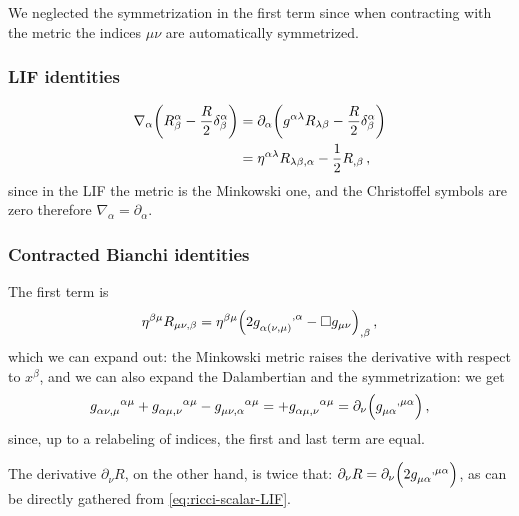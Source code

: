 \documentclass[main.tex]{subfiles}
\begin{document}
We neglected the symmetrization in the first term since when contracting with the metric the indices \(\mu \nu \) are automatically symmetrized.

\subsubsection{LIF identities}

%
\begin{subequations}
\begin{align}
  \nabla_{\alpha }\qty(R^{ \alpha }_{\beta } - \frac{R}{2} \delta^{\alpha }_{\beta }) &=  \partial_{\alpha }\qty(g^{\alpha \lambda }R_{\lambda \beta } - \frac{R}{2} \delta^{\alpha }_{\beta })  \\
  &= \eta^{\alpha \lambda }R_{\lambda \beta, \alpha} - \frac{1}{2} R_{,\beta } \label{eq:contracted-Bianchi-LIF}
\,,
\end{align}
\end{subequations}
%
since in the LIF the metric is the Minkowski one, and the Christoffel symbols are zero therefore \(\nabla_{\alpha }= \partial_{\alpha }\).

\subsubsection{Contracted Bianchi identities}

The first term is
%
\begin{equation}
  \eta^{\beta \mu }R_{\mu \nu, \beta } = 
  \eta^{\beta \mu }\qty(2 \tensor{g}{_{\alpha (\nu , \mu )}^{,\alpha }} - \square g_{\mu \nu })_{, \beta}
\,,
\end{equation}
%
which we can expand out: the Minkowski metric raises the derivative with respect to \(x^{\beta }\), and we can also expand the Dalambertian and the symmetrization: we get
%
\begin{equation}
  \tensor{g}{_{\alpha \nu , \mu }^{ \alpha \mu }}
  + \tensor{g}{_{\alpha \mu , \nu }^{ \alpha \mu }}
  - \tensor{g}{_{\mu \nu, \alpha }^{ \alpha \mu }}
  =   + \tensor{g}{_{\alpha \mu , \nu }^{ \alpha \mu }}
  = \partial_{\nu }\qty( \tensor{g}{_{\mu \alpha}^{,\mu \alpha }})
\,,
\end{equation}
%
since, up to a relabeling of indices, the first and last term are equal.

The derivative \(\partial_{\nu }R\), on the other hand, is twice that: \(\partial_{\nu }R = \partial_{\nu }\qty(2 \tensor{g}{_{\mu \alpha }^{, \mu \alpha }})\), as can be directly gathered from \eqref{eq:ricci-scalar-LIF}.
\end{document}
